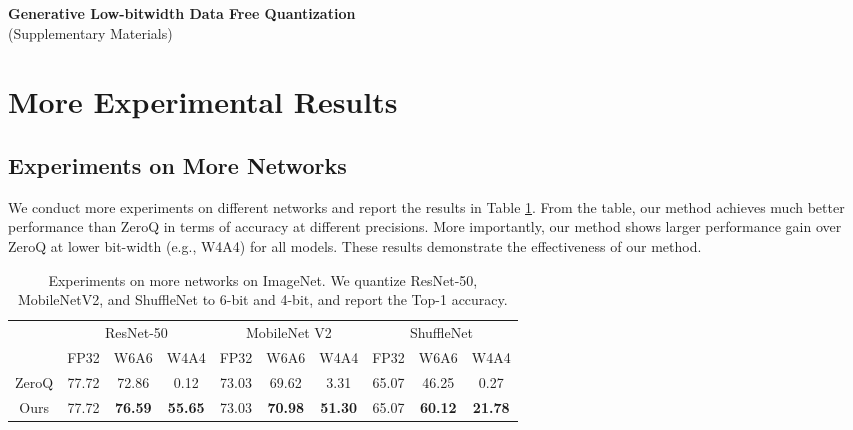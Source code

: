 \documentclass[runningheads]{llncs}
\begin{document}
\clearpage
\appendix

\begin{center}
\Large{\textbf{Generative Low-bitwidth Data Free Quantization} \\ (Supplementary Materials)}
\end{center}

\section{More Experimental Results}
\subsection{Experiments on More Networks}

We conduct more experiments on different networks and report the results in Table \ref{tb:comparison_morenet}. From the table, our method achieves much better performance than ZeroQ \cite{Cai_2020_CVPR} in terms of accuracy at different precisions. More importantly, our method shows larger performance gain over ZeroQ at lower bit-width (e.g., W4A4) for all models. These results demonstrate the effectiveness of our method.

\begin{table}[h]
\renewcommand\arraystretch{1.1}
\renewcommand{\tabcolsep}{5.0pt}
\begin{center}
\caption{Experiments on more networks on ImageNet. We quantize ResNet-50, MobileNetV2, and ShuffleNet to 6-bit and 4-bit, and report the Top-1 accuracy.}
\label{tb:comparison_morenet}
\begin{tabular}{c|ccc|ccc|ccc}
\hline
      & \multicolumn{3}{c|}{ResNet-50}          & \multicolumn{3}{c|}{MobileNet V2}       & \multicolumn{3}{c}{ShuffleNet}         \\ \cline{2-10} 
      & FP32  & W6A6           & W4A4           & FP32  & W6A6           & W4A4           & FP32  & W6A6           & W4A4           \\ \hline
ZeroQ & 77.72 & 72.86          & 0.12           & 73.03 & 69.62          & 3.31           & 65.07 & 46.25          & 0.27           \\
Ours  & 77.72 & \textbf{76.59} & \textbf{55.65} & 73.03 & \textbf{70.98} & \textbf{51.30} & 65.07 & \textbf{60.12} & \textbf{21.78} \\ \hline
\end{tabular}
\end{center}
\end{table}
\end{document}
